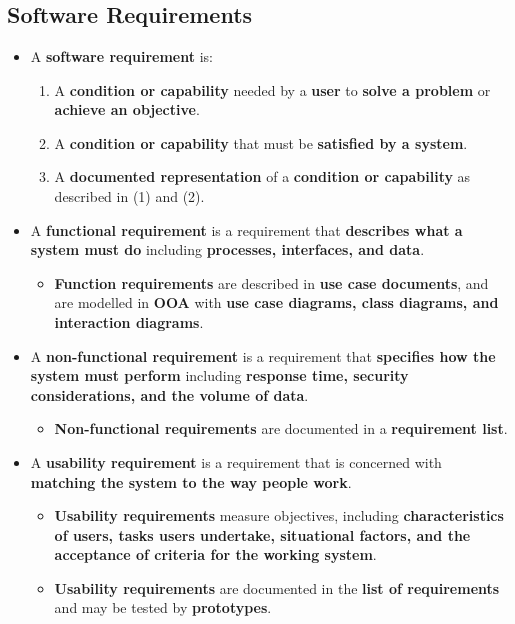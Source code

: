 \documentclass[16pt]{article}
\begin{document}
    \section*{}

    \subsection*{Software Requirements}
    \begin{itemize}
        \item A \textbf{software requirement} is:
        \begin{enumerate}
            \item A \textbf{condition or capability} needed by a \textbf{user} to \textbf{solve a problem} or \textbf{achieve an objective}.
            \item A \textbf{condition or capability} that must be \textbf{satisfied by a system}.
            \item A \textbf{documented representation} of a \textbf{condition or capability} as described in (1) and (2).
        \end{enumerate}
        \item A \textbf{functional requirement} is a requirement that \textbf{describes what a system must do} including \textbf{processes, interfaces, and data}.
        \begin{itemize}
            \item \textbf{Function requirements} are described in \textbf{use case documents}, and are modelled in \textbf{OOA} with \textbf{use case diagrams, class diagrams, and interaction diagrams}.
        \end{itemize}
        \item A \textbf{non-functional requirement} is a requirement that \textbf{specifies how the system must perform} including \textbf{response time, security considerations, and the volume of data}.
        \begin{itemize}
            \item \textbf{Non-functional requirements} are documented in a \textbf{requirement list}.
        \end{itemize}
        \item A \textbf{usability requirement} is a requirement that is concerned with \textbf{matching the system to the way people work}.
            \begin{itemize}
                \item \textbf{Usability requirements} measure objectives, including \textbf{characteristics of users, tasks users undertake, situational factors, and the acceptance of criteria for the working system}.
                \item \textbf{Usability requirements} are documented in the \textbf{list of requirements} and may be tested by \textbf{prototypes}.
            \end{itemize}
    \end{itemize}
\end{document}
